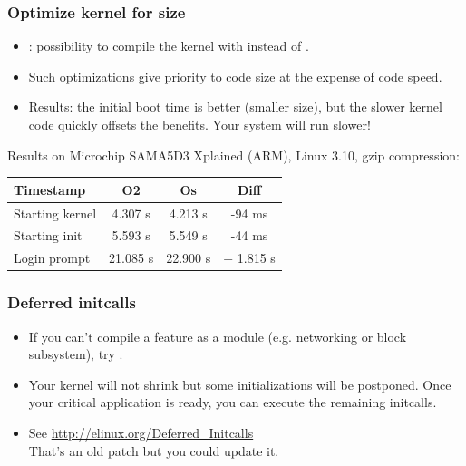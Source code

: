 \begin{frame}
\frametitle{Optimize kernel for size}
\begin{itemize}
\item {}: possibility to compile the kernel
      with  instead of .
\item Such optimizations give priority to code size at
      the expense of code speed.
\item Results: the initial boot time is better (smaller
      size), but the slower kernel code quickly offsets
      the benefits. Your system will run slower!
\end{itemize}
Results on Microchip SAMA5D3 Xplained (ARM), Linux 3.10, gzip compression:
\newline\newline
\begin{tabular}{| l || c | c | c |}
\hline
Timestamp & O2 & Os & Diff \\
\hline
Starting kernel & 4.307 s & 4.213 s & -94 ms \\
Starting init & 5.593 s & 5.549 s & -44 ms \\
Login prompt & 21.085 s & 22.900 s & + 1.815 s \\
\hline
\end{tabular}
\newline\newline
\small
\end{frame}

\begin{frame}
\frametitle{Deferred initcalls}
\begin{itemize}
\item If you can't compile a feature as a module (e.g. networking or block
      subsystem), try .
\item Your kernel will not shrink but some initializations will be
      postponed. Once your critical application is ready, you can
      execute the remaining initcalls.
\item See \url{http://elinux.org/Deferred_Initcalls}\\
      That's an old patch but you could update it.
\end{itemize}
\end{frame}

